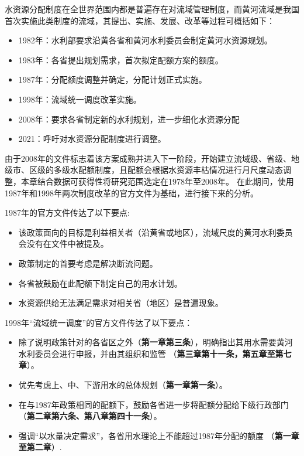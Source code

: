 水资源分配制度在全世界范围内都是普遍存在对流域管理制度，而黄河流域是我国首次实施此类制度的流域，其提出、实施、发展、改革等过程可概括如下\cite{wang2019b}：%
\begin{itemize}
    \item 1982年：水利部要求沿黄各省和黄河水利委员会制定黄河水资源规划\cite{wang2019, wang2019a}。
    \item 1983年：各省提出规划需求，首次拟定配额方案的额度。
    \item 1987年：分配额度调整并确定，分配计划正式实施。
    \item 1998年：流域统一调度改革实施。
    \item 2008年：要求各省制定新的水利规划，进一步细化水资源分配\cite{wang2019,wang2019a}
    \item 2021：呼吁对水资源分配制度进行调整。
\end{itemize}

由于2008年的文件标志着该方案成熟并进入下一阶段，开始建立流域级、省级、地级市、区级的多级水配额制度，且配额会根据水资源丰枯情况进行月尺度动态调整，本章结合数据可获得性将研究范围选定在1978年至2008年。
在此期间，使用1987年和1998年两次制度改革的官方文件为基础，进行接下来的分析。

1987年的官方文件传达了以下要点:

\begin{itemize}
	\item 该政策面向的目标是利益相关者（沿黄省或地区），流域尺度的黄河水利委员会没有在文件中被提及。
	\item 政策制定的首要考虑是解决断流问题。
	\item 各省被鼓励在此配额下制定自己的用水计划。
	\item 水资源供给无法满足需求对相关省（地区）是普遍现象。
\end{itemize}

1998年“流域统一调度”的官方文件传达了以下要点：

\begin{itemize}
	\item 除了说明政策针对的各省区之外（\textbf{第一章第三条}），明确指出其用水需要黄河水利委员会进行申报，并由其组织和监管 （\textbf{第三章第十一条，第五章至第七章}）。
	\item 优先考虑上、中、下游用水的总体规划（\textbf{第一章第一条}）。
	\item 在与1987年政策相同的配额下，鼓励各省进一步将配额分配给下级行政部门（\textbf{第二章第六条、第八章第四十一条}）。
	\item 强调“以水量决定需求”，各省用水理论上不能超过1987年分配的额度 （\textbf{第一章至第二章}）.
\end{itemize}

